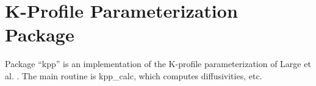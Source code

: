
\chapter{K-Profile Parameterization Package}
  
Package ``kpp'' is an implementation of the K-profile parameterization of
Large et al. \cite{lar94}.  The main routine is kpp\_calc, which
computes diffusivities, etc.
